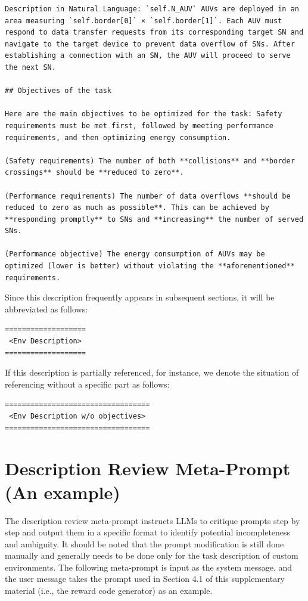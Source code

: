 \documentclass{article}
\begin{document}
\begin{verbatim}
Description in Natural Language: `self.N_AUV` AUVs are deployed in an area measuring `self.border[0]` × `self.border[1]`. Each AUV must respond to data transfer requests from its corresponding target SN and navigate to the target device to prevent data overflow of SNs. After establishing a connection with an SN, the AUV will proceed to serve the next SN.

## Objectives of the task

Here are the main objectives to be optimized for the task: Safety requirements must be met first, followed by meeting performance requirements, and then optimizing energy consumption.

(Safety requirements) The number of both **collisions** and **border crossings** should be **reduced to zero**.

(Performance requirements) The number of data overflows **should be reduced to zero as much as possible**. This can be achieved by **responding promptly** to SNs and **increasing** the number of served SNs.

(Performance objective) The energy consumption of AUVs may be optimized (lower is better) without violating the **aforementioned** requirements.

\end{verbatim}

Since this description frequently appears in subsequent sections, it will be abbreviated as follows:

\begin{verbatim}
===================
 <Env Description>
===================
\end{verbatim}

If this description is partially referenced, for instance, we denote the situation of referencing without a specific part as follows:

\begin{verbatim}
==================================
 <Env Description w/o objectives>
==================================
\end{verbatim}


\section{Description Review Meta-Prompt (An example)} 

The description review meta-prompt instructs LLMs to critique prompts step by step and output them in a specific format to identify potential incompleteness and ambiguity. It should be noted that the prompt modification is still done manually and generally needs to be done only for the task description of custom environments. The following meta-prompt is input as the system message, and the user message takes the prompt used in Section 4.1 of this supplementary material (i.e., the reward code generator) as an example.
\end{document}
